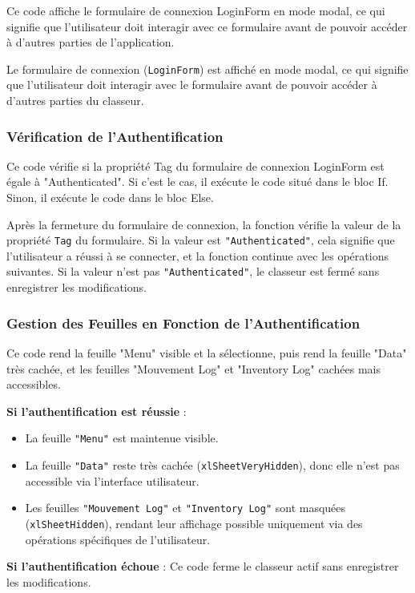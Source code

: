 \documentclass[a4paper, oneside, 12pt, final]{extreport}
\begin{document}
Ce code affiche le formulaire de connexion LoginForm en mode modal, ce qui signifie que l'utilisateur doit interagir avec ce formulaire avant de pouvoir accéder à d'autres parties de l'application.

Le formulaire de connexion (\texttt{LoginForm}) est affiché en mode modal, ce qui signifie que l'utilisateur doit interagir avec le formulaire avant de pouvoir accéder à d'autres parties du classeur.

\subsubsection{Vérification de l'Authentification}

Ce code vérifie si la propriété Tag du formulaire de connexion LoginForm est égale à "Authenticated". Si c'est le cas, il exécute le code situé dans le bloc If. Sinon, il exécute le code dans le bloc Else.

Après la fermeture du formulaire de connexion, la fonction vérifie la valeur de la propriété \texttt{Tag} du formulaire.
Si la valeur est \texttt{"Authenticated"}, cela signifie que l'utilisateur a réussi à se connecter, et la fonction continue avec les opérations suivantes.
Si la valeur n'est pas \texttt{"Authenticated"}, le classeur est fermé sans enregistrer les modifications.

\subsubsection{Gestion des Feuilles en Fonction de l'Authentification}
Ce code rend la feuille "Menu" visible et la sélectionne, puis rend la feuille "Data" très cachée, et les feuilles "Mouvement Log" et "Inventory Log" cachées mais accessibles.

\textbf{Si l'authentification est réussie} :
\begin{itemize}
    \item La feuille \texttt{"Menu"} est maintenue visible.
    \item La feuille \texttt{"Data"} reste très cachée (\texttt{xlSheetVeryHidden}), donc elle n'est pas accessible via l'interface utilisateur.
    \item Les feuilles \texttt{"Mouvement Log"} et \texttt{"Inventory Log"} sont masquées (\texttt{xlSheetHidden}), rendant leur affichage possible uniquement via des opérations spécifiques de l'utilisateur.
\end{itemize}

\textbf{Si l'authentification échoue} :
Ce code ferme le classeur actif sans enregistrer les modifications.
\end{document}

